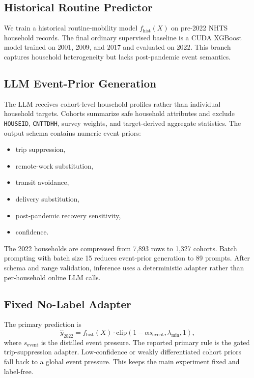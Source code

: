 \documentclass[11pt]{article}
\newcommand{\nhts}{\textsc{NHTS}}
\begin{document}
\subsection{Historical Routine Predictor}

We train a historical routine-mobility model $f_{\mathrm{hist}}(X)$ on pre-2022 \nhts{} household records.
The final ordinary supervised baseline is a CUDA XGBoost model trained on 2001, 2009, and 2017 and evaluated on 2022.
This branch captures household heterogeneity but lacks post-pandemic event semantics.

\subsection{LLM Event-Prior Generation}

The LLM receives cohort-level household profiles rather than individual household targets.
Cohorts summarize safe household attributes and exclude \texttt{HOUSEID}, \texttt{CNTTDHH}, survey weights, and target-derived aggregate statistics.
The output schema contains numeric event priors:
\begin{itemize}
    \item trip suppression,
    \item remote-work substitution,
    \item transit avoidance,
    \item delivery substitution,
    \item post-pandemic recovery sensitivity,
    \item confidence.
\end{itemize}
The 2022 households are compressed from 7,893 rows to 1,327 cohorts.
Batch prompting with batch size 15 reduces event-prior generation to 89 prompts.
After schema and range validation, inference uses a deterministic adapter rather than per-household online LLM calls.

\subsection{Fixed No-Label Adapter}

The primary prediction is
\begin{equation}
\widehat{y}_{2022}
= f_{\mathrm{hist}}(X)
\cdot
\mathrm{clip}\left(1 - \alpha s_{\mathrm{event}}, \lambda_{\min}, 1\right),
\label{eq:adapter}
\end{equation}
where $s_{\mathrm{event}}$ is the distilled event pressure.
The reported primary rule is the gated trip-suppression adapter.
Low-confidence or weakly differentiated cohort priors fall back to a global event pressure.
This keeps the main experiment fixed and label-free.
\end{document}
